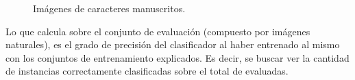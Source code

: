 \begin{itemize}
		\begin{figure}[htbp]
			\centering
			\caption[Chars74k manuscritas]{Imágenes de caracteres manuscritos.}
			\label{fig: chars74k-hand}
		\end{figure}
		
	\end{itemize}		
	
	Lo que calcula sobre el conjunto de evaluación (compuesto por imágenes naturales), es el grado de precisión del clasificador al haber entrenado al mismo con los conjuntos de entrenamiento explicados. Es decir, se buscar ver la cantidad de instancias correctamente clasificadas sobre el total de evaluadas.